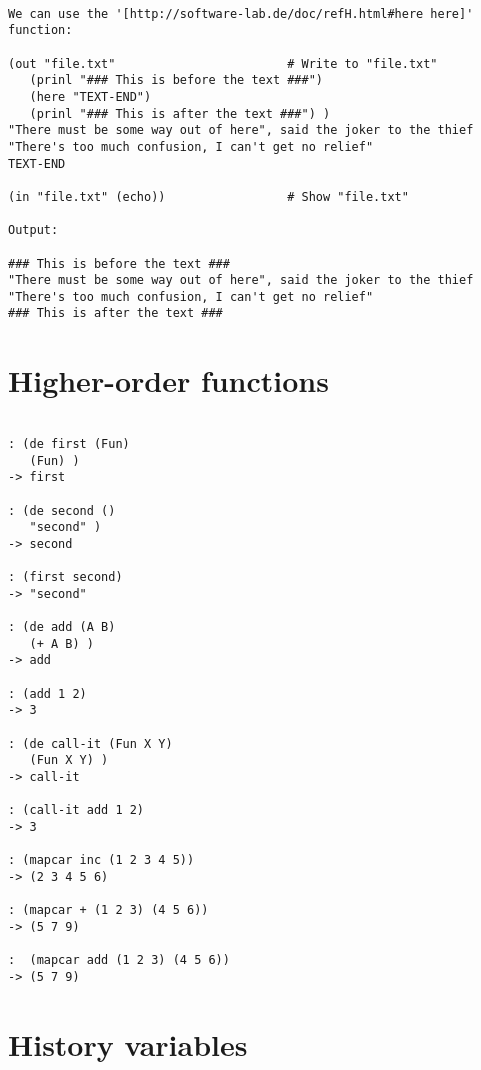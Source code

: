 \begin{verbatim}

We can use the '[http://software-lab.de/doc/refH.html#here here]' function:

(out "file.txt"                        # Write to "file.txt"
   (prinl "### This is before the text ###")
   (here "TEXT-END")
   (prinl "### This is after the text ###") )
"There must be some way out of here", said the joker to the thief
"There's too much confusion, I can't get no relief"
TEXT-END

(in "file.txt" (echo))                 # Show "file.txt"

Output:

### This is before the text ###
"There must be some way out of here", said the joker to the thief
"There's too much confusion, I can't get no relief"
### This is after the text ###

\end{verbatim}

\section*{Higher-order functions}

\begin{verbatim}

: (de first (Fun)
   (Fun) )
-> first

: (de second ()
   "second" )
-> second

: (first second)
-> "second"

: (de add (A B)
   (+ A B) )
-> add

: (add 1 2)
-> 3

: (de call-it (Fun X Y)
   (Fun X Y) )
-> call-it

: (call-it add 1 2)
-> 3

: (mapcar inc (1 2 3 4 5))
-> (2 3 4 5 6)

: (mapcar + (1 2 3) (4 5 6))
-> (5 7 9)

:  (mapcar add (1 2 3) (4 5 6))
-> (5 7 9)

\end{verbatim}

\section*{History variables}

